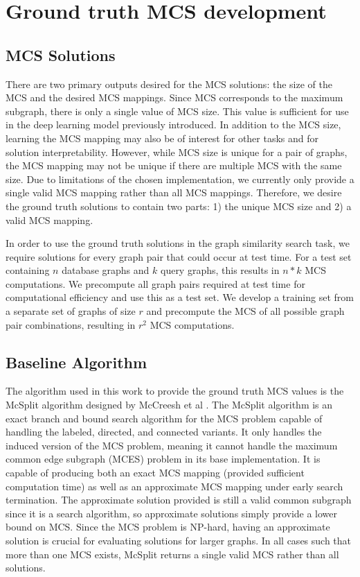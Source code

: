 \section{Ground truth MCS development}
\subsection{MCS Solutions}
There are two primary outputs desired for the MCS solutions: the size of the MCS and the desired MCS mappings. Since MCS corresponds to the maximum subgraph, there is only a single value of MCS size. This value is sufficient for use in the deep learning model previously introduced. In addition to the MCS size, learning the MCS mapping may also be of interest for other tasks and for solution interpretability. However, while MCS size is unique for a pair of graphs, the MCS mapping may not be unique if there are multiple MCS with the same size. Due to limitations of the chosen implementation, we currently only provide a single valid MCS mapping rather than all MCS mappings. Therefore, we desire the ground truth solutions to contain two parts: 1) the unique MCS size and 2) a valid MCS mapping.

In order to use the ground truth solutions in the graph similarity search task, we require solutions for every graph pair that could occur at test time. For a test set containing $n$ database graphs and $k$ query graphs, this results in $n*k$ MCS computations. We precompute all graph pairs required at test time for computational efficiency and use this as a test set. We develop a training set from a separate set of graphs of size $r$ and precompute the MCS of all possible graph pair combinations, resulting in $r^2$ MCS computations.

\subsection{Baseline Algorithm}
The algorithm used in this work to provide the ground truth MCS values is the McSplit algorithm designed by McCreesh et al \cite{mccreesh2017partitioning}. The McSplit algorithm is an exact branch and bound search algorithm for the MCS problem capable of handling the labeled, directed, and connected variants. It only handles the induced version of the MCS problem, meaning it cannot handle the maximum common edge subgraph (MCES) problem in its base implementation. It is capable of producing both an exact MCS mapping (provided sufficient computation time) as well as an approximate MCS mapping under early search termination. The approximate solution provided is still a valid common subgraph since it is a search algorithm, so approximate solutions simply provide a lower bound on MCS. Since the MCS problem is NP-hard, having an approximate solution is crucial for evaluating solutions for larger graphs. In all cases such that more than one MCS exists, McSplit returns a single valid MCS rather than all solutions.

